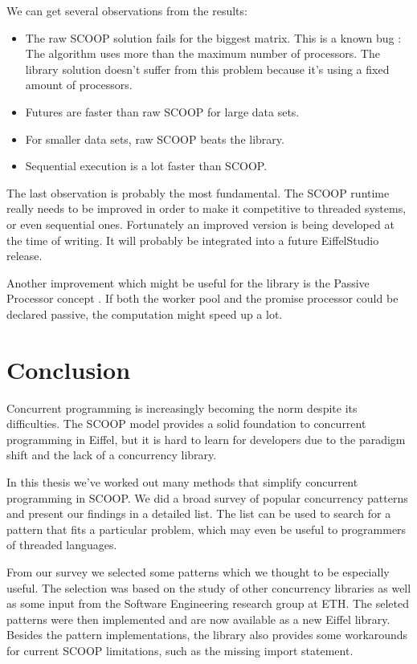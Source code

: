 \documentclass[a4paper,10pt,titlepage]{article}
\begin{document}
We can get several observations from the results:

\begin{itemize}
 \item The raw SCOOP solution fails for the biggest matrix.
 This is a known bug \cite{web:scoop-issues}:
 The algorithm uses more than the maximum number of processors.
 The library solution doesn't suffer from this problem because it's using a fixed amount of processors.
 \item Futures are faster than raw SCOOP for large data sets.
 \item For smaller data sets, raw SCOOP beats the library.
 \item Sequential execution is a lot faster than SCOOP.
\end{itemize}

The last observation is probably the most fundamental.
The SCOOP runtime really needs to be improved in order to make it competitive to threaded systems, or even sequential ones.
Fortunately an improved version \cite{thesis:scottwest} is being developed at the time of writing.
It will probably be integrated into a future EiffelStudio release.

Another improvement which might be useful for the library is the Passive Processor concept \cite{paper:passive-processors}.
If both the worker pool and the promise processor could be declared passive, the computation might speed up a lot.

\section{Conclusion}

Concurrent programming is increasingly becoming the norm despite its difficulties.
The SCOOP model provides a solid foundation to concurrent programming in Eiffel, 
but it is hard to learn for developers due to the paradigm shift and the lack of a concurrency library.

In this thesis we've worked out many methods that simplify concurrent programming in SCOOP.
We did a broad survey of popular concurrency patterns and present our findings in a detailed list.
The list can be used to search for a pattern that fits a particular problem, which may even be useful to programmers of threaded languages.

From our survey we selected some patterns which we thought to be especially useful.
The selection was based on the study of other concurrency libraries as well as some input from the Software Engineering research group at ETH.
The seleted patterns were then implemented and are now available as a new Eiffel library.
Besides the pattern implementations, the library also provides some workarounds for current SCOOP limitations, such as the missing import statement.
\end{document}
